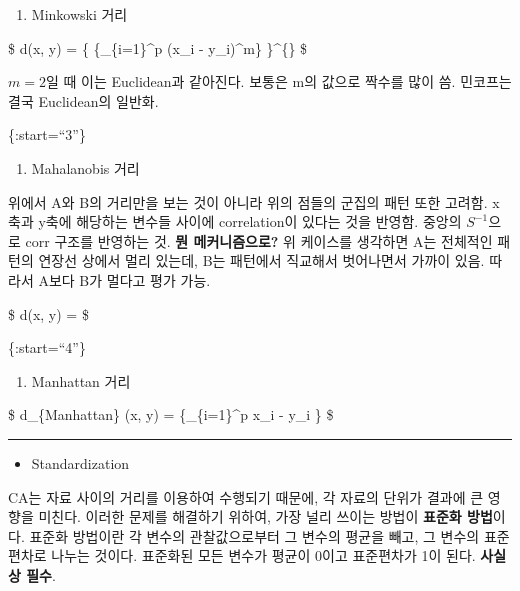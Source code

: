 \documentclass[
]{book}
\providecommand{\tightlist}{%
  \setlength{\itemsep}{0pt}\setlength{\parskip}{0pt}}
\begin{document}
{{{\begin{enumerate}
\def\labelenumi{\arabic{enumi}.}
\setcounter{enumi}{1}
\tightlist
\item
  Minkowski 거리
\end{enumerate}

\$
d(\pmb x, \pmb y) = \left\{ \{\sum\_\{i=1\}\^{}p (x\_i - y\_i)\^{}m\} \right\}\^{}\{\}
\$

\(m=2\)일 때 이는 Euclidean과 같아진다. 보통은 m의 값으로 짝수를 많이 씀. 민코프는 결국 Euclidean의 일반화.

\{:start=``3''\}

\begin{enumerate}
\def\labelenumi{\arabic{enumi}.}
\setcounter{enumi}{2}
\tightlist
\item
  Mahalanobis 거리
\end{enumerate}

위에서 A와 B의 거리만을 보는 것이 아니라 위의 점들의 군집의 패턴 또한 고려함. x축과 y축에 해당하는 변수들 사이에 correlation이 있다는 것을 반영함. 중앙의 \(S^{-1}\)으로 corr 구조를 반영하는 것. \textbf{뭔 메커니즘으로?} 위 케이스를 생각하면 A는 전체적인 패턴의 연장선 상에서 멀리 있는데, B는 패턴에서 직교해서 벗어나면서 가까이 있음. 따라서 A보다 B가 멀다고 평가 가능.

\$
d(\pmb x, \pmb y) = 
\$

\{:start=``4''\}

\begin{enumerate}
\def\labelenumi{\arabic{enumi}.}
\setcounter{enumi}{3}
\tightlist
\item
  Manhattan 거리
\end{enumerate}

\$
d\_\{Manhattan\} (\pmb x, \pmb y) = \{\sum\_\{i=1\}\^{}p \vert x\_i - y\_i \vert\}
\$

\begin{center}\rule{0.5\linewidth}{0.5pt}\end{center}

\begin{itemize}
\tightlist
\item
  Standardization
\end{itemize}

CA는 자료 사이의 거리를 이용하여 수행되기 때문에, 각 자료의 단위가 결과에 큰 영향을 미친다. 이러한 문제를 해결하기 위하여, 가장 널리 쓰이는 방법이 \textbf{표준화 방법}이다. 표준화 방법이란 각 변수의 관찰값으로부터 그 변수의 평균을 빼고, 그 변수의 표준편차로 나누는 것이다. 표준화된 모든 변수가 평균이 0이고 표준편차가 1이 된다. \textbf{사실상 필수}.

}}}
\end{document}
